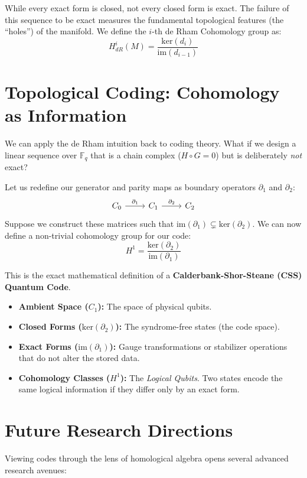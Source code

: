 \documentclass[11pt, a4paper]{article}
\newcommand{\F}{\mathbb{F}}
\newcommand{\im}{\text{im}}
\newcommand{\kerop}{\text{ker}}
\begin{document}
	While every exact form is closed, not every closed form is exact. The failure of this sequence to be exact measures the fundamental topological features (the ``holes'') of the manifold. We define the $i$-th de Rham Cohomology group as:
	$$ H^i_{dR}(M) = \frac{\kerop(d_i)}{\im(d_{i-1})} $$
	
	\section{Topological Coding: Cohomology as Information}
	
	We can apply the de Rham intuition back to coding theory. What if we design a linear sequence over $\F_q$ that is a chain complex ($H \circ G = 0$) but is deliberately \emph{not} exact?
	
	Let us redefine our generator and parity maps as boundary operators $\partial_1$ and $\partial_2$:
	\[
	\begin{tikzcd}
		C_0 \arrow[r, "\partial_1"] & C_1 \arrow[r, "\partial_2"] & C_2
	\end{tikzcd}
	\]
	Suppose we construct these matrices such that $\im(\partial_1) \subsetneq \kerop(\partial_2)$. We can now define a non-trivial cohomology group for our code:
	$$ H^1 = \frac{\kerop(\partial_2)}{\im(\partial_1)} $$
	
	This is the exact mathematical definition of a \textbf{Calderbank-Shor-Steane (CSS) Quantum Code}. 
	\begin{itemize}
		\item \textbf{Ambient Space ($C_1$):} The space of physical qubits.
		\item \textbf{Closed Forms ($\kerop(\partial_2)$):} The syndrome-free states (the code space).
		\item \textbf{Exact Forms ($\im(\partial_1)$):} Gauge transformations or stabilizer operations that do not alter the stored data.
		\item \textbf{Cohomology Classes ($H^1$):} The \emph{Logical Qubits}. Two states encode the same logical information if they differ only by an exact form.
	\end{itemize}
	
	\section{Future Research Directions}
	
	Viewing codes through the lens of homological algebra opens several advanced research avenues:
	
\end{document}
